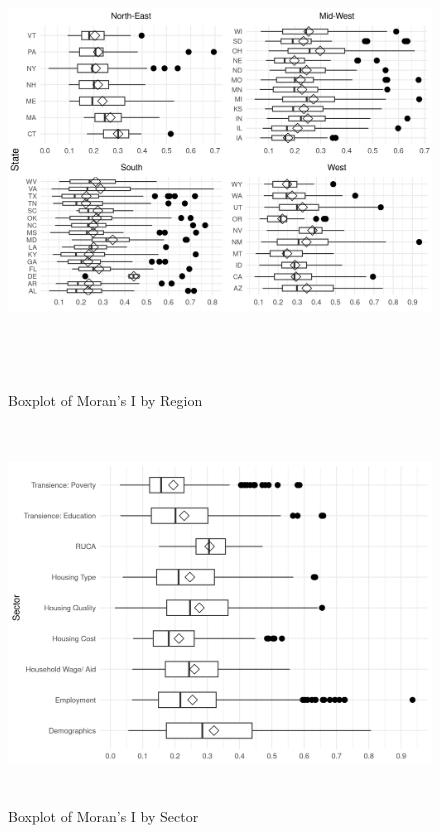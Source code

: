 \begin{figure}[htbp]
    \centering
     \includegraphics[width=1\textwidth, height=12cm]{plots/moran_state.png}
     \caption{Boxplot of Moran's I by Region}
     \label{fig:moran_region}
 \end{figure}

 \begin{figure}[htbp]
    \centering
     \includegraphics[width=1\textwidth, height=10cm]{plots/moran_sector}
     \caption{Boxplot of Moran's I by Sector}
     \label{fig:moran_sector}
 \end{figure}




